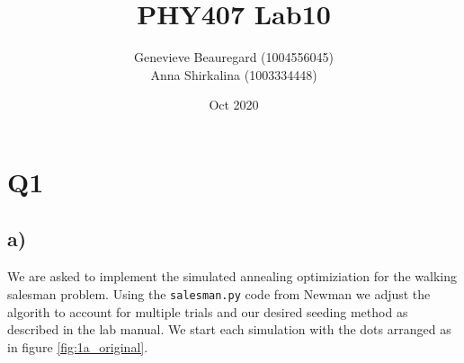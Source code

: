 \documentclass{article}
\begin{document}
\title{PHY407 Lab10}
\author{Genevieve Beauregard (1004556045)\\ Anna Shirkalina (1003334448)}
\date{Oct 2020}
\maketitle


\section*{Q1}
\subsection*{a)}
We are asked to implement the simulated annealing optimiziation for the walking salesman problem. Using the \texttt{salesman.py} code from Newman we adjust the algorith to account for multiple trials and our desired seeding method as described in the lab manual. We start each simulation with the dots arranged as in figure \ref{fig:1a_original}.
\end{document}
